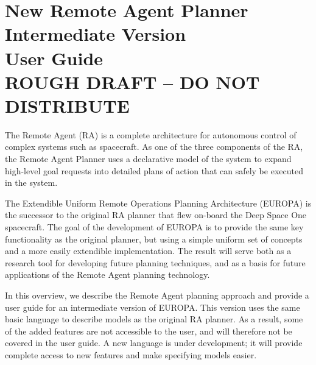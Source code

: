 





\def\docauthor{Ari K. J\'onsson \and Jeremy Frank}




\chapter{New Remote Agent Planner \\
Intermediate Version \\ User Guide \\
ROUGH DRAFT -- DO NOT DISTRIBUTE}



The Remote Agent (RA) is a complete architecture for autonomous
control of complex systems such as spacecraft.  As one of the three
components of the RA, the Remote Agent Planner uses a declarative
model of the system to expand high-level goal requests into detailed
plans of action that can safely be executed in the system.

The Extendible Uniform Remote Operations Planning Architecture
(EUROPA) is the successor to the original RA planner that flew
on-board the Deep Space One spacecraft.  The goal of the development
of EUROPA is to provide the same key functionality as the original
planner, but using a simple uniform set of concepts and a more easily
extendible implementation.  The result will serve both as a research
tool for developing future planning techniques, and as a basis for
future applications of the Remote Agent planning technology.

In this overview, we describe the Remote Agent planning approach and
provide a user guide for an intermediate version of EUROPA. This
version uses the same basic language to describe models as the
original RA planner.  As a result, some of the added features are not
accessible to the user, and will therefore not be covered in the user
guide.  A new language is under development; it will provide complete
access to new features and make specifying models easier.

